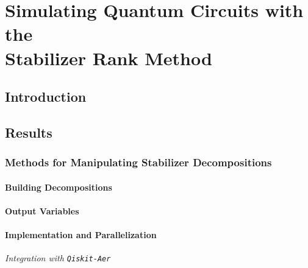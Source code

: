 
\chapter[Simulating Quantum Circuits with Stabilizer Rank]{Simulating Quantum Circuits with the\\ Stabilizer Rank Method}
\label{chap:simulator}
\section{Introduction}
\section{Results}
\subsection{Methods for Manipulating Stabilizer Decompositions}
\subsubsection*{Building Decompositions}
\subsubsection*{Output Variables}
\subsubsection*{Implementation and Parallelization}
\par
\large{\itshape{Integration with \texttt{Qiskit-Aer}}}
\par
